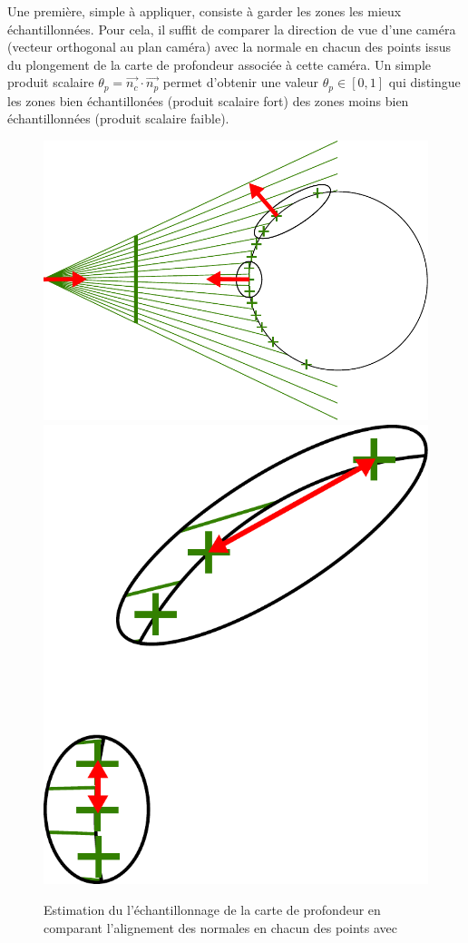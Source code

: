 \documentclass{report}
\begin{document}
Une première, simple à appliquer, consiste à garder les zones les mieux échantillonnées.
Pour cela, il suffit de comparer la direction de vue d'une caméra (vecteur orthogonal au plan caméra) avec la normale en chacun des points issus du plongement de la carte de profondeur associée à cette caméra.
Un simple produit scalaire $\theta_p = \vec{n_c} \cdot \vec{n_p}$ permet d'obtenir une valeur $\theta_p \in [0,1]$ qui distingue les zones bien échantillonées (produit scalaire fort) des zones moins bien échantillonnées (produit scalaire faible).

\begin{figure}[h]
\centering
	\includegraphics[scale=0.5]{GoodVisibility-Normals}
	\includegraphics[scale=0.4]{GoodVisibility-Zoom}
	\caption{Estimation du l'échantillonnage de la carte de profondeur en comparant l'alignement des normales en chacun des points avec }
\end{figure}
\end{document}
